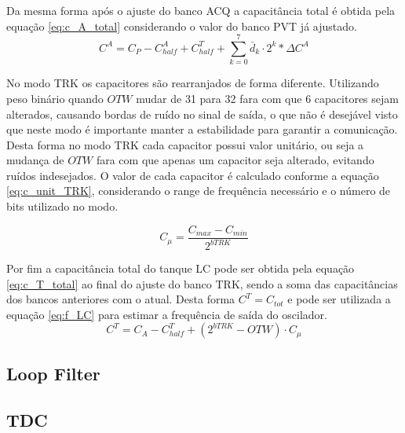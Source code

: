 Da mesma forma após o ajuste do banco ACQ a capacitância total é obtida pela equação \ref{eq:c_A_total} considerando o valor do banco PVT já ajustado.
\begin{equation}
	C^A = C_P - C^A_{half} + C^T_{half} + \sum_{k=0}^{7} \bar{d}_k \cdot 2^k * 	\Delta C^A
	\label{eq:c_A_total}
\end{equation}


No modo TRK os capacitores são rearranjados de forma diferente. Utilizando peso binário quando $OTW$ mudar de 31 para 32 fara com que 6 capacitores sejam alterados, causando bordas de ruído no sinal de saída, o que não é desejável visto que neste modo é importante manter a estabilidade para garantir a comunicação.   Desta forma no modo TRK cada capacitor possui valor unitário, ou seja a mudança de $OTW$ fara com que apenas um capacitor seja alterado, evitando ruídos indesejados. O valor de cada capacitor é calculado conforme a equação \ref{eq:c_unit_TRK}, considerando o range de frequência necessário e o número de bits utilizado no modo. 

\begin{equation}
	C_\mu = \frac{	C_{max} - C_{min}}{2^{bTRK}}
	\label{eq:c_unit_TRK}
\end{equation}

Por fim a capacitância total do tanque LC pode ser obtida pela equação \ref{eq:c_T_total} ao final do ajuste do banco TRK, sendo a soma das capacitâncias dos bancos anteriores com o atual. Desta forma $C^T = C_{tot}$ e pode ser utilizada a equação \ref{eq:f_LC} para estimar a frequência de saída do oscilador.
\begin{equation}
	C^T = C_A -  C^T_{half} + (2^{bTRK} - OTW) \cdot 	C_\mu
	\label{eq:c_T_total}
\end{equation}

\subsection{Loop Filter}

\subsection{TDC}

